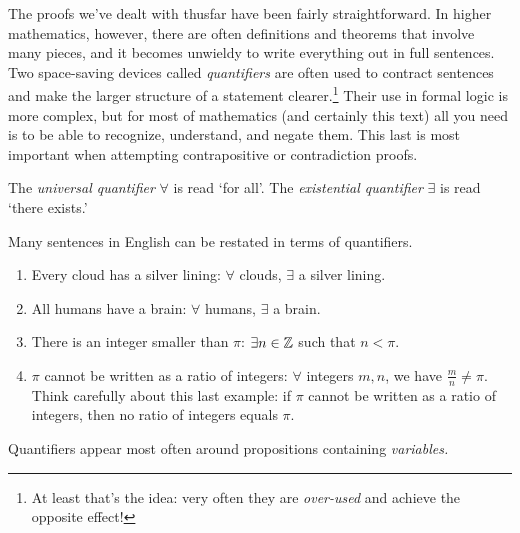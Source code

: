 \newpage


The proofs we've dealt with thusfar have been fairly straightforward. In higher mathematics, however, there are often definitions and theorems that involve many pieces, and it becomes unwieldy to write everything out in full sentences. Two space-saving devices called \emph{quantifiers} are often used to contract sentences and make the larger structure of a statement clearer.\footnote{At least that's the idea: very often they are \emph{over-used} and achieve the opposite effect!} Their use in formal logic is more complex, but for most of mathematics (and certainly this text) all you need is to be able to recognize, understand, and negate them. This last is most important when attempting contrapositive or contradiction proofs.

\begin{defn}
The \emph{universal quantifier} $\forall$ is read `for all'. The \emph{existential quantifier} $\exists$ is read `there exists.'
\end{defn}

 Many sentences in English can be restated in terms of quantifiers.

\begin{examples}{}{}
\begin{enumerate}
\item Every cloud has a silver lining: $\forall$ clouds, $\exists$ a silver lining.
\item All humans have a brain: $\forall$ humans, $\exists$ a brain.
\item There is an integer smaller than $\pi$: $\exists n\in\mathbb{Z}$ such that $n<\pi$.
\item $\pi$ cannot be written as a ratio of integers: $\forall$ integers $m,n$, we have $\frac{m}{n}\neq\pi$.\\
Think carefully about this last example: if $\pi$ cannot be written as a ratio of integers, then no ratio of integers equals $\pi$.
\end{enumerate}
\end{examples}


Quantifiers appear most often around propositions containing \emph{variables.}

